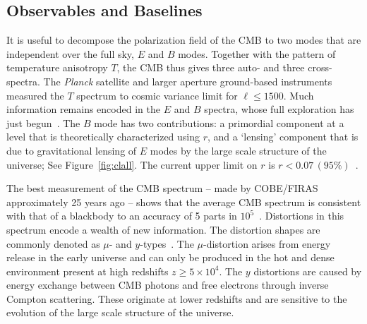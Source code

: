 
\subsection{Observables and Baselines}
\label{sec:observables}

\vspace{-0.05in} 

It is useful to decompose the polarization field of the CMB to two modes that are independent over the full sky, 
$E$ and $B$ modes. 
Together with the pattern of temperature anisotropy $T$, the \ac{CMB} thus gives three auto- and three cross-spectra. 
The {\it Planck} satellite and larger aperture ground-based instruments measured the $T$ spectrum to cosmic
variance limit for $\ell \leq 1500$. Much information remains encoded in the $E$ and $B$ spectra, whose full exploration 
has just begun~\cite{planck2015parameters, Hanson2013,PB_BB,bicep2Bmode, bkp2015}.  
The $B$ mode has two contributions: a primordial component at a level that is theoretically characterized 
using $r$, and a `lensing' component that is due to gravitational lensing of $E$ modes by the large scale structure
of the universe; See Figure~\ref{fig:clall}. The current upper limit on $r$ is $r<0.07\, (95\%)$~\cite{Array:2015xqh}.



The best measurement of the \ac{CMB} spectrum -- made by COBE/FIRAS approximately 25 years ago --
shows that the average CMB spectrum is consistent with that of a blackbody to an accuracy of 5 parts 
in $10^{5}$~\cite{Mather1994, Fixsen1996}. Distortions in this spectrum encode a wealth of new information.
The distortion shapes are commonly denoted as $\mu$- and $y$-types~\cite{Zeldovich1969, Sunyaev1970mu}. The 
$\mu$-distortion arises from energy release in the early universe and can only be produced in the hot and dense 
environment present at high redshifts $ z \geq 5\times10^{4} $. The $y$ distortions are caused by 
energy exchange between \ac{CMB} photons and free electrons through inverse Compton 
scattering. These originate at lower redshifts and are sensitive to the 
evolution of the large scale structure of the universe. 

